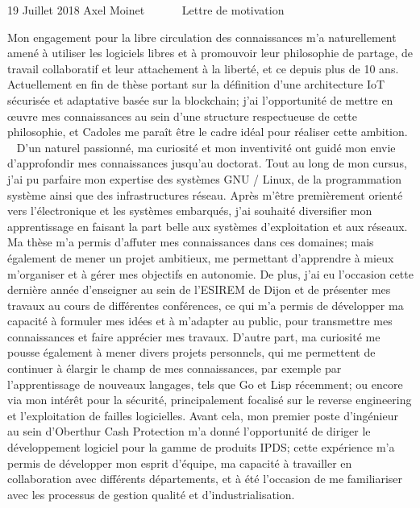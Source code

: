 \documentclass[11pt, a4paper]{awesome-cv}
\begin{document}
\makecvheader[R]

\makecvfooter
  {19 Juillet 2018}
  {Axel Moinet~~~ ~~~Lettre de motivation}
  {}

\makelettertitle

\begin{cvletter}

  Mon engagement pour la libre circulation des connaissances m'a naturellement amené à utiliser les logiciels libres et à promouvoir leur philosophie de partage, de travail collaboratif et leur attachement à la liberté, et ce depuis plus de 10 ans. Actuellement en fin de thèse portant sur la définition d'une architecture IoT sécurisée et adaptative basée sur la blockchain; j'ai l'opportunité de mettre en \oe{}uvre mes connaissances au sein d'une structure respectueuse de cette philosophie, et Cadoles me paraît être le cadre idéal pour réaliser cette ambition.
~\vspace{-0.4cm}
D'un naturel passionné, ma curiosité et mon inventivité ont guidé mon envie d'approfondir mes connaissances jusqu'au doctorat. Tout au long de mon cursus, j'ai pu parfaire mon expertise des systèmes GNU / Linux, de la programmation système ainsi que des infrastructures réseau. Après m'être premièrement orienté vers l'électronique et les systèmes embarqués, j'ai souhaité diversifier mon apprentissage en faisant la part belle aux systèmes d'exploitation et aux réseaux. Ma thèse m'a permis d'affuter mes connaissances dans ces domaines; mais également de mener un projet ambitieux, me permettant d'apprendre à mieux m'organiser et à gérer mes objectifs en autonomie. De plus, j'ai eu l'occasion cette dernière année d'enseigner au sein de l'ESIREM de Dijon et de présenter mes travaux au cours de différentes conférences, ce qui m'a permis de développer ma capacité à formuler mes idées et à m'adapter au public, pour transmettre mes connaissances et faire apprécier mes travaux. D'autre part, ma curiosité me pousse également à mener divers projets personnels, qui me permettent de continuer à élargir le champ de mes connaissances, par exemple par l'apprentissage de nouveaux langages, tels que Go et Lisp récemment; ou encore via mon intérêt pour la sécurité, principalement focalisé sur le reverse engineering et l'exploitation de failles logicielles. Avant cela, mon premier poste d'ingénieur au sein d'Oberthur Cash Protection m'a donné l'opportunité de diriger le développement logiciel pour la gamme de produits IPDS; cette expérience m'a permis de développer mon esprit d'équipe, ma capacité à travailler en collaboration avec différents départements, et à été l'occasion de me familiariser avec les processus de gestion qualité et d'industrialisation.

\end{cvletter}
\end{document}
